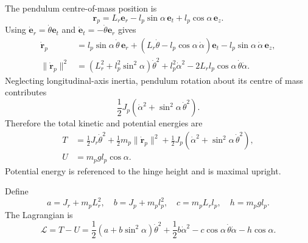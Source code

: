 The pendulum centre-of-mass position is
\begin{equation}
\boldsymbol r_p=L_r\boldsymbol e_r-l_p\sin\alpha\,\boldsymbol e_t
+l_p\cos\alpha\,\boldsymbol e_z.
\end{equation}
Using $\dot{\boldsymbol e}_r=\dot\theta\boldsymbol e_t$ and
$\dot{\boldsymbol e}_t=-\dot\theta\boldsymbol e_r$ gives
\begin{align}
\dot{\boldsymbol r}_p&=l_p\sin\alpha\,\dot\theta\,\boldsymbol e_r
+(L_r\dot\theta-l_p\cos\alpha\,\dot\alpha)\boldsymbol e_t
-l_p\sin\alpha\,\dot\alpha\,\boldsymbol e_z,\\
\|\dot{\boldsymbol r}_p\|^2&=(L_r^2+l_p^2\sin^2\alpha)\dot\theta^2
+l_p^2\dot\alpha^2-2L_rl_p\cos\alpha\,\dot\theta\dot\alpha.
\end{align}
Neglecting longitudinal-axis inertia, pendulum rotation about its centre
of mass contributes
\[\frac12J_p(\dot\alpha^2+\sin^2\alpha\,\dot\theta^2).\]
Therefore the total kinetic and potential energies are
\begin{align}
T&=\frac12J_r\dot\theta^2+\frac12m_p\|\dot{\boldsymbol r}_p\|^2
+\frac12J_p(\dot\alpha^2+\sin^2\alpha\,\dot\theta^2),\\
U&=m_pgl_p\cos\alpha.
\end{align}
Potential energy is referenced to the hinge height and is maximal upright.

Define
\begin{equation}\label{eq:constants}
a=J_r+m_pL_r^2,\quad b=J_p+m_pl_p^2,\quad
c=m_pL_rl_p,\quad h=m_pgl_p.
\end{equation}
The Lagrangian is
\begin{equation}\label{eq:lagrangian}
\mathcal L=T-U=
\frac12(a+b\sin^2\alpha)\dot\theta^2+\frac12b\dot\alpha^2
-c\cos\alpha\,\dot\theta\dot\alpha-h\cos\alpha.
\end{equation}

